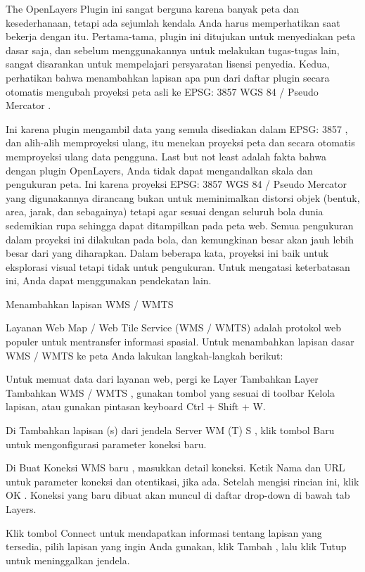 \documentclass[]{book}
\begin{document}
The OpenLayers Plugin ini sangat berguna karena banyak peta dan kesederhanaan, tetapi ada sejumlah kendala Anda harus memperhatikan saat bekerja dengan itu. Pertama-tama, plugin ini ditujukan untuk menyediakan peta dasar saja, dan sebelum menggunakannya untuk melakukan tugas-tugas lain, sangat disarankan untuk mempelajari persyaratan lisensi penyedia. Kedua, perhatikan bahwa menambahkan lapisan apa pun dari daftar plugin secara otomatis mengubah proyeksi peta asli ke EPSG: 3857 WGS 84 / Pseudo Mercator .

Ini karena plugin mengambil data yang semula disediakan dalam EPSG: 3857 , dan alih-alih memproyeksi ulang, itu menekan proyeksi peta dan secara otomatis memproyeksi ulang data pengguna. Last but not least adalah fakta bahwa dengan plugin OpenLayers, Anda tidak dapat mengandalkan skala dan pengukuran peta. Ini karena proyeksi EPSG: 3857 WGS 84 / Pseudo Mercator yang digunakannya dirancang bukan untuk meminimalkan distorsi objek (bentuk, area, jarak, dan sebagainya) tetapi agar sesuai dengan seluruh bola dunia sedemikian rupa sehingga dapat ditampilkan pada peta web. Semua pengukuran dalam proyeksi ini dilakukan pada bola, dan kemungkinan besar akan jauh lebih besar dari yang diharapkan. Dalam beberapa kata, proyeksi ini baik untuk eksplorasi visual tetapi tidak untuk pengukuran. Untuk mengatasi keterbatasan ini, Anda dapat menggunakan pendekatan lain.

Menambahkan lapisan WMS / WMTS

Layanan Web Map / Web Tile Service (WMS / WMTS) adalah protokol web populer untuk mentransfer informasi spasial. Untuk menambahkan lapisan dasar WMS / WMTS ke peta Anda lakukan langkah-langkah berikut:

Untuk memuat data dari layanan web, pergi ke Layer \textbar{} Tambahkan Layer \textbar{} Tambahkan WMS / WMTS , gunakan tombol yang sesuai di toolbar Kelola lapisan, atau gunakan pintasan keyboard Ctrl + Shift + W.

Di Tambahkan lapisan (s) dari jendela Server WM (T) S , klik tombol Baru untuk mengonfigurasi parameter koneksi baru.

Di Buat Koneksi WMS baru , masukkan detail koneksi. Ketik Nama dan URL untuk parameter koneksi dan otentikasi, jika ada. Setelah mengisi rincian ini, klik OK . Koneksi yang baru dibuat akan muncul di daftar drop-down di bawah tab Layers.

Klik tombol Connect untuk mendapatkan informasi tentang lapisan yang tersedia, pilih lapisan yang ingin Anda gunakan, klik Tambah , lalu klik Tutup untuk meninggalkan jendela.
\end{document}
